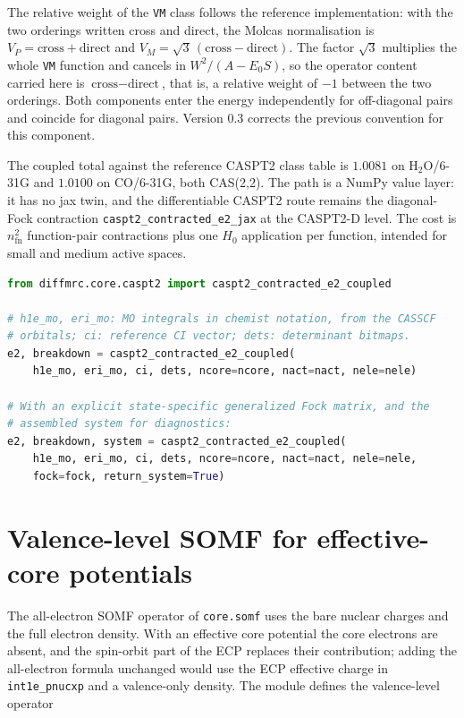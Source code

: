 The relative weight of the \texttt{VM} class follows the reference
implementation: with the two orderings written cross and direct, the
Molcas normalisation is $V_P = \text{cross} + \text{direct}$ and
$V_M = \sqrt{3}\,(\text{cross} - \text{direct})$.  The factor
$\sqrt{3}$ multiplies the whole \texttt{VM} function and cancels in
$W^2/(A - E_0 S)$, so the operator content carried here is
$\text{cross} - \text{direct}$, that is, a relative weight of $-1$
between the two orderings.  Both components enter the energy
independently for off-diagonal pairs and coincide for diagonal pairs.
Version 0.3 corrects the previous convention for this component.

The coupled total against the reference CASPT2 class table is $1.0081$
on H$_2$O/6-31G and $1.0100$ on CO/6-31G, both CAS(2,2).  The path is a
NumPy value layer: it has no jax twin, and the differentiable CASPT2
route remains the diagonal-Fock
contraction \texttt{caspt2\_contracted\_e2\_jax} at the CASPT2-D level.
The cost is $n_{\mathrm{fn}}^2$ function-pair contractions plus one
$H_0$ application per function, intended for small and medium active
spaces.

\begin{lstlisting}[language=Python]
from diffmrc.core.caspt2 import caspt2_contracted_e2_coupled

# h1e_mo, eri_mo: MO integrals in chemist notation, from the CASSCF
# orbitals; ci: reference CI vector; dets: determinant bitmaps.
e2, breakdown = caspt2_contracted_e2_coupled(
    h1e_mo, eri_mo, ci, dets, ncore=ncore, nact=nact, nele=nele)

# With an explicit state-specific generalized Fock matrix, and the
# assembled system for diagnostics:
e2, breakdown, system = caspt2_contracted_e2_coupled(
    h1e_mo, eri_mo, ci, dets, ncore=ncore, nact=nact, nele=nele,
    fock=fock, return_system=True)
\end{lstlisting}

\section{Valence-level SOMF for effective-core potentials}
\label{sec:new-somf-ecp}

The all-electron SOMF operator of \texttt{core.somf} uses the bare
nuclear charges and the full electron density.  With an effective core
potential the core electrons are absent, and the spin-orbit part of the
ECP replaces their contribution; adding the all-electron formula
unchanged would use the ECP effective charge in
\texttt{int1e\_pnucxp} and a valence-only density.  The module defines
the valence-level operator

